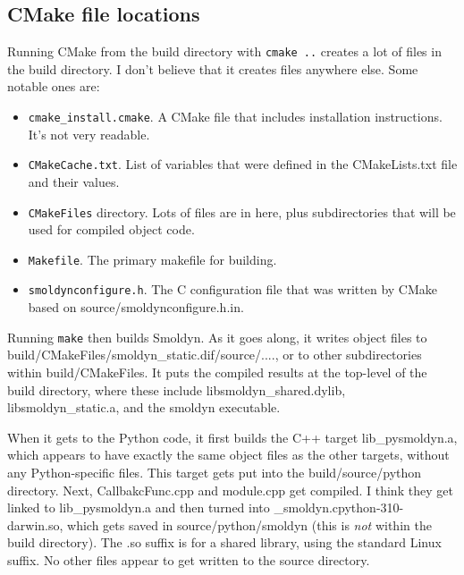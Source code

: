 \documentclass {scrbook}
\newcommand {\ttt} {\texttt}
\begin{document}
\subsection{CMake file locations}

Running CMake from the build directory with \ttt{cmake ..} creates a lot of files in the build directory. I don't believe that it creates files anywhere else. Some notable ones are:
\begin{itemize}
\item \ttt{cmake\_install.cmake}. A CMake file that includes installation instructions. It's not very readable.
\item \ttt{CMakeCache.txt}. List of variables that were defined in the CMakeLists.txt file and their values.
\item \ttt{CMakeFiles} directory. Lots of files are in here, plus subdirectories that will be used for compiled object code.
\item \ttt{Makefile}. The primary makefile for building.
\item \ttt{smoldynconfigure.h}. The C configuration file that was written by CMake based on source/smoldynconfigure.h.in.
\end{itemize}

Running \ttt{make} then builds Smoldyn. As it goes along, it writes object files to build/CMakeFiles/smoldyn\_static.dif/source/...., or to other subdirectories within build/CMakeFiles. It puts the compiled results at the top-level of the build directory, where these include libsmoldyn\_shared.dylib, libsmoldyn\_static.a, and the smoldyn executable.

When it gets to the Python code, it first builds the C++ target lib\_pysmoldyn.a, which appears to have exactly the same object files as the other targets, without any Python-specific files. This target gets put into the build/source/python directory. Next, CallbakcFunc.cpp and module.cpp get compiled. I think they get linked to lib\_pysmoldyn.a and then turned into \_smoldyn.cpython-310-darwin.so, which gets saved in source/python/smoldyn (this is \textit{not} within the build directory). The .so suffix is for a shared library, using the standard Linux suffix. No other files appear to get written to the source directory.
\end{document}
